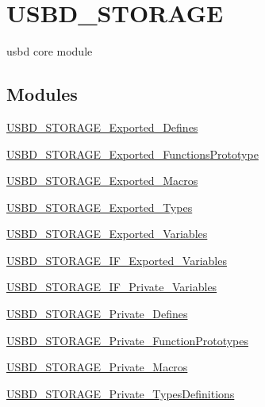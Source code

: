 \hypertarget{group___u_s_b_d___s_t_o_r_a_g_e}{}\section{U\+S\+B\+D\+\_\+\+S\+T\+O\+R\+A\+GE}
\label{group___u_s_b_d___s_t_o_r_a_g_e}


usbd core module  


\subsection*{Modules}
\begin{DoxyCompactItemize}
\item 
\mbox{\hyperlink{group___u_s_b_d___s_t_o_r_a_g_e___exported___defines}{U\+S\+B\+D\+\_\+\+S\+T\+O\+R\+A\+G\+E\+\_\+\+Exported\+\_\+\+Defines}}
\item 
\mbox{\hyperlink{group___u_s_b_d___s_t_o_r_a_g_e___exported___functions_prototype}{U\+S\+B\+D\+\_\+\+S\+T\+O\+R\+A\+G\+E\+\_\+\+Exported\+\_\+\+Functions\+Prototype}}
\item 
\mbox{\hyperlink{group___u_s_b_d___s_t_o_r_a_g_e___exported___macros}{U\+S\+B\+D\+\_\+\+S\+T\+O\+R\+A\+G\+E\+\_\+\+Exported\+\_\+\+Macros}}
\item 
\mbox{\hyperlink{group___u_s_b_d___s_t_o_r_a_g_e___exported___types}{U\+S\+B\+D\+\_\+\+S\+T\+O\+R\+A\+G\+E\+\_\+\+Exported\+\_\+\+Types}}
\item 
\mbox{\hyperlink{group___u_s_b_d___s_t_o_r_a_g_e___exported___variables}{U\+S\+B\+D\+\_\+\+S\+T\+O\+R\+A\+G\+E\+\_\+\+Exported\+\_\+\+Variables}}
\item 
\mbox{\hyperlink{group___u_s_b_d___s_t_o_r_a_g_e___i_f___exported___variables}{U\+S\+B\+D\+\_\+\+S\+T\+O\+R\+A\+G\+E\+\_\+\+I\+F\+\_\+\+Exported\+\_\+\+Variables}}
\item 
\mbox{\hyperlink{group___u_s_b_d___s_t_o_r_a_g_e___i_f___private___variables}{U\+S\+B\+D\+\_\+\+S\+T\+O\+R\+A\+G\+E\+\_\+\+I\+F\+\_\+\+Private\+\_\+\+Variables}}
\item 
\mbox{\hyperlink{group___u_s_b_d___s_t_o_r_a_g_e___private___defines}{U\+S\+B\+D\+\_\+\+S\+T\+O\+R\+A\+G\+E\+\_\+\+Private\+\_\+\+Defines}}
\item 
\mbox{\hyperlink{group___u_s_b_d___s_t_o_r_a_g_e___private___function_prototypes}{U\+S\+B\+D\+\_\+\+S\+T\+O\+R\+A\+G\+E\+\_\+\+Private\+\_\+\+Function\+Prototypes}}
\item 
\mbox{\hyperlink{group___u_s_b_d___s_t_o_r_a_g_e___private___macros}{U\+S\+B\+D\+\_\+\+S\+T\+O\+R\+A\+G\+E\+\_\+\+Private\+\_\+\+Macros}}
\item 
\mbox{\hyperlink{group___u_s_b_d___s_t_o_r_a_g_e___private___types_definitions}{U\+S\+B\+D\+\_\+\+S\+T\+O\+R\+A\+G\+E\+\_\+\+Private\+\_\+\+Types\+Definitions}}
\end{DoxyCompactItemize}
